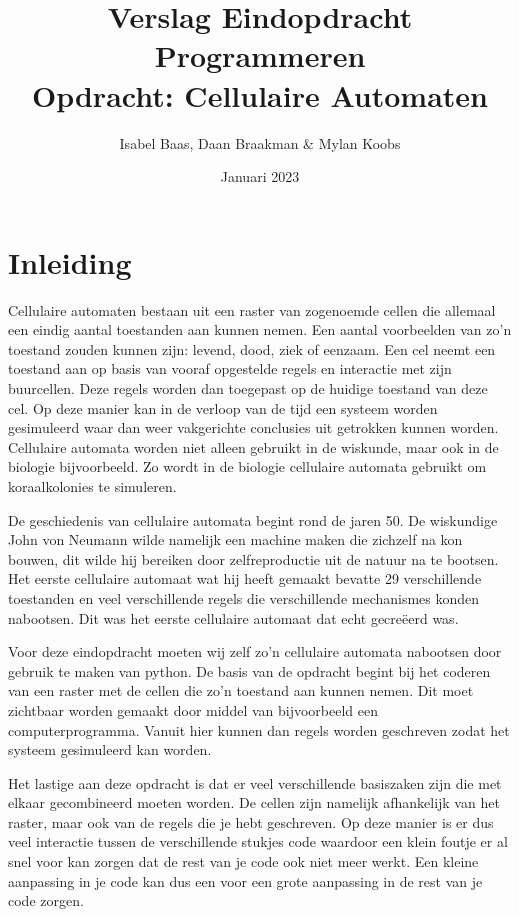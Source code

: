 \documentclass{article}
\title{%
    Verslag Eindopdracht Programmeren \\
    \large Opdracht: Cellulaire Automaten}
\author{Isabel Baas, Daan Braakman \& Mylan Koobs}
\date{Januari 2023}
\begin{document}
\maketitle
\newpage

\tableofcontents
\newpage
\section{Inleiding}
Cellulaire automaten bestaan uit een raster van zogenoemde cellen die allemaal een eindig aantal toestanden aan kunnen nemen. Een aantal voorbeelden van zo'n toestand zouden kunnen zijn: levend, dood, ziek of eenzaam. Een cel neemt een toestand aan op basis van vooraf opgestelde regels en interactie met zijn buurcellen. Deze regels worden dan toegepast op de huidige toestand van deze cel. Op deze manier kan in de verloop van de tijd een systeem worden gesimuleerd waar dan weer vakgerichte conclusies uit getrokken kunnen worden. Cellulaire automata worden niet alleen gebruikt in de wiskunde, maar ook in de biologie bijvoorbeeld. Zo wordt in de biologie cellulaire automata gebruikt om koraalkolonies te simuleren. 

De geschiedenis van cellulaire automata begint rond de jaren 50. De wiskundige John von Neumann wilde namelijk een machine maken die zichzelf na kon bouwen, dit wilde hij bereiken door zelfreproductie uit de natuur na te bootsen. Het eerste cellulaire automaat wat hij heeft gemaakt bevatte 29 verschillende toestanden en veel verschillende regels die verschillende mechanismes konden nabootsen. Dit was het eerste cellulaire automaat dat echt gecreëerd was.

Voor deze eindopdracht moeten wij zelf zo'n cellulaire automata nabootsen door gebruik te maken van python. De basis van de opdracht begint bij het coderen van een raster met de cellen die zo'n toestand aan kunnen nemen. Dit moet zichtbaar worden gemaakt door middel van bijvoorbeeld een computerprogramma. Vanuit hier kunnen dan regels worden geschreven zodat het systeem gesimuleerd kan worden. 

Het lastige aan deze opdracht is dat er veel verschillende basiszaken zijn die met elkaar gecombineerd moeten worden. De cellen zijn namelijk afhankelijk van het raster, maar ook van de regels die je hebt geschreven. Op deze manier is er dus veel interactie tussen de verschillende stukjes code waardoor een klein foutje er al snel voor kan zorgen dat de rest van je code ook niet meer werkt. Een kleine aanpassing in je code kan dus een voor een grote aanpassing in de rest van je code zorgen. 
\end{document}
